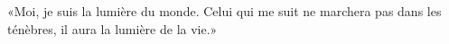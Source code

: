 \encetemps \jesusfoulejuifs
	«Moi, je suis la lumière du monde.
Celui qui me suit ne marchera pas dans les ténèbres,
	il aura la lumière de la vie.»
